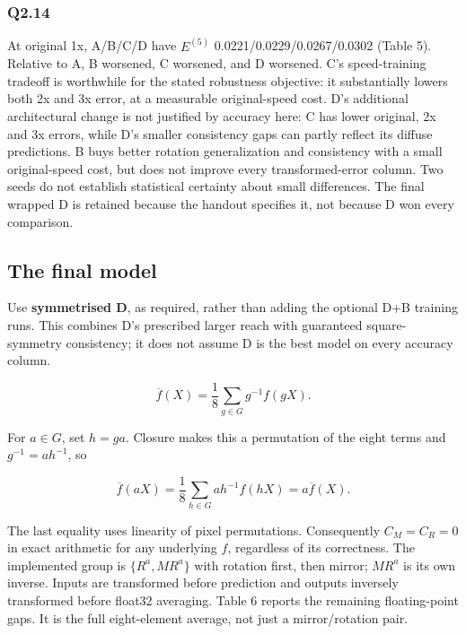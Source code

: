 \documentclass[
  10pt,
  a4paper,
]{article}
\begin{document}
\subsubsection{Q2.14}\label{q2.14}

At original 1x, A/B/C/D have \(E^{(5)}\) 0.0221/0.0229/0.0267/0.0302
(Table 5). Relative to A, B worsened, C worsened, and D worsened. C's
speed-training tradeoff is worthwhile for the stated robustness
objective: it substantially lowers both 2x and 3x error, at a measurable
original-speed cost. D's additional architectural change is not
justified by accuracy here: C has lower original, 2x and 3x errors,
while D's smaller consistency gaps can partly reflect its diffuse
predictions. B buys better rotation generalization and consistency with
a small original-speed cost, but does not improve every
transformed-error column. Two seeds do not establish statistical
certainty about small differences. The final wrapped D is retained
because the handout specifies it, not because D won every comparison.

\subsection{The final model}\label{the-final-model}

Use \textbf{symmetrised D}, as required, rather than adding the optional
D+B training runs. This combines D's prescribed larger reach with
guaranteed square-symmetry consistency; it does not assume D is the best
model on every accuracy column.

\[\overline f(X)=\frac18\sum_{g\in G}g^{-1}f(gX).\]

For \(a\in G\), set \(h=ga\). Closure makes this a permutation of the
eight terms and \(g^{-1}=a h^{-1}\), so

\[\overline f(aX)=\frac18\sum_{h\in G}a h^{-1}f(hX)=a\overline f(X).\]

The last equality uses linearity of pixel permutations. Consequently
\(C_M=C_R=0\) in exact arithmetic for any underlying \(f\), regardless
of its correctness. The implemented group is \(\{R^a,MR^a\}\) with
rotation first, then mirror; \(MR^a\) is its own inverse. Inputs are
transformed before prediction and outputs inversely transformed before
float32 averaging. Table 6 reports the remaining floating-point gaps. It
is the full eight-element average, not just a mirror/rotation pair.
\end{document}
